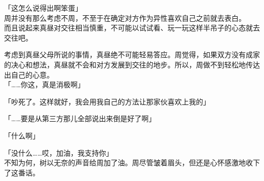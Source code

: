 「这怎么说得出啊笨蛋」\\

周并没有那么考虑不周，不至于在确定对方作为异性喜欢自己之前就去表白。\\

而且说起来真昼对交往相当慎重，不可能以试试看、玩一玩这样半吊子的心态就去交往吧。

考虑到真昼父母所说的事情，真昼绝不可能轻易答应。周觉得，如果双方没有成家的决心和想法，真昼就不会和对方发展到交往的地步。所以，周做不到轻松地传达出自己的心意。\\%

「……你这，真是消极啊」

「吵死了。这样就好，我会用我自己的方法让那家伙喜欢上我的」

「……要是从第三方那儿全部说出来倒是好了啊」

「什么啊」

「没什么……哎，加油，我支持你」\\

不知为何，树以无奈的声音给周加了油。周尽管皱着眉头，但还是心怀感激地收下了这番话。
